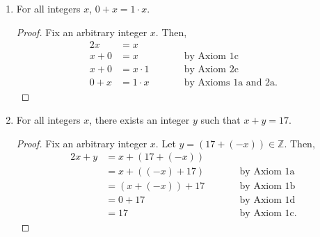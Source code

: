 \documentclass{article}
\begin{document}
\begin{enumerate}
\begin{enumerate}
    			\item For all integers $x$, $0 + x = 1 \cdot x$.
                        \begin{proof}
                            Fix an arbitrary integer $x$. Then,
                            \begin{alignat*}{2}
                                x &= x \\
                                x + 0 &= x                  &\qquad &\textrm{by Axiom 1c}   \\
                                x + 0 &= x \cdot 1          &\qquad &\textrm{by Axiom 2c}   \\
                                0 + x &= 1 \cdot x          &\qquad &\textrm{by Axioms 1a and 2a.}
                            \end{alignat*}
                        \end{proof}

    			\item For all integers $x$, there exists an integer $y$ such that $x + y = 17$.
                        \begin{proof}
                            Fix an arbitrary integer $x$. Let $y = (17 + (\minus x)) \in \mathbb{Z}$. Then, 
                            \begin{alignat*}{2}
                                x + y &= x + (17 + (\minus x)) \\
                                &= x + ((\minus x ) + 17)   &\qquad &\textrm{by Axiom 1a}   \\
                                &= (x + (\minus x)) + 17    &\qquad &\textrm{by Axiom 1b}   \\
                                &= 0 + 17                   &\qquad &\textrm{by Axiom 1d}   \\
                                &= 17                       &\qquad &\textrm{by Axiom 1c.}  
                            \end{alignat*}
                        \end{proof}


\end{enumerate}
\end{enumerate}
\end{document}
